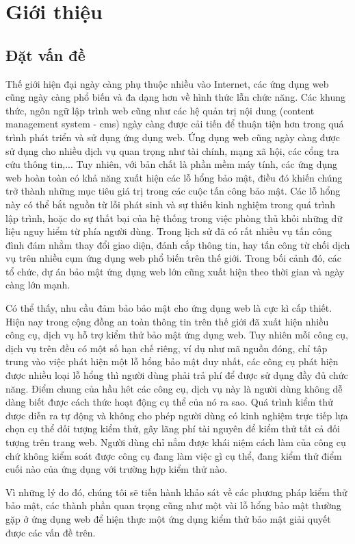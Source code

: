 \cleardoublepage
{}
\chapter{Giới thiệu}
\section{Đặt vấn đề}
Thế giới hiện đại ngày càng phụ thuộc nhiều vào Internet, các ứng dụng web cũng ngày càng phổ biến và đa dạng hơn về hình thức lẫn chức năng. Các khung thức, ngôn ngữ lập trình web cũng như các hệ quản trị nội dung (content management system - \acrshort{cms}) ngày càng được cải tiến để thuận tiện hơn trong quá trình phát triển và sử dụng ứng dụng web. Ứng dụng web cũng ngày càng được sử dụng cho nhiều dịch vụ quan trọng như tài chính, mạng xã hội, các cổng tra cứu thông tin,... Tuy nhiên, với bản chất là phần mềm máy tính, các ứng dụng web hoàn toàn có khả năng xuất hiện các lỗ hổng bảo mật, điều đó khiến chúng trở thành những mục tiêu giá trị trong các cuộc tấn công bảo mật. Các lỗ hổng này có thể bắt nguồn từ lỗi phát sinh và sự thiếu kinh nghiệm trong quá trình lập trình, hoặc do sự thất bại của hệ thống trong việc phòng thủ khỏi những dữ liệu nguy hiểm từ phía người dùng. Trong lịch sử đã có rất nhiều vụ tấn công đình đám nhằm thay đổi giao diện, đánh cắp thông tin, hay tấn công từ chối dịch vụ trên nhiều cụm ứng dụng web phổ biến trên thế giới. Trong bối cảnh đó, các tổ chức, dự án bảo mật ứng dụng web lớn cũng xuất hiện theo thời gian và ngày càng lớn mạnh.

Có thể thấy, nhu cầu đảm bảo bảo mật cho ứng dụng web là cực kì cấp thiết. Hiện nay trong cộng đồng an toàn thông tin trên thế giới đã xuất hiện nhiều công cụ, dịch vụ hỗ trợ kiểm thử bảo mật ứng dụng web. Tuy nhiên mỗi công cụ, dịch vụ trên đều có một số hạn chế riêng, ví dụ như mã nguồn đóng, chỉ tập trung vào việc phát hiện một lỗ hổng bảo mật duy nhất, các công cụ phát hiện được nhiều loại lỗ hổng thì người dùng phải trả phí để được sử dụng đầy đủ chức năng. Điểm chung của hầu hêt các công cụ, dịch vụ này là người dùng không dễ dàng biết được cách thức hoạt động cụ thể của nó ra sao. Quá trình kiểm thử được diễn ra tự động và không cho phép người dùng có kinh nghiệm trực tiếp lựa chọn cụ thể đối tượng kiểm thử, gây lãng phí tài nguyên để kiểm thử tất cả đối tượng trên trang web. Người dùng chỉ nắm được khái niệm cách làm của công cụ chứ không kiểm soát được công cụ đang làm việc gì cụ thể, đang kiểm thử điểm cuối nào của ứng dụng với trường hợp kiểm thử nào.\par
Vì những lý do đó, chúng tôi sẽ tiến hành khảo sát về các phương pháp kiểm thử bảo mật, các thành phần quan trọng cũng như một vài lỗ hổng bảo mật thường gặp ở ứng dụng web để hiện thực một ứng dụng kiểm thử bảo mật giải quyết được các vấn đề trên.


